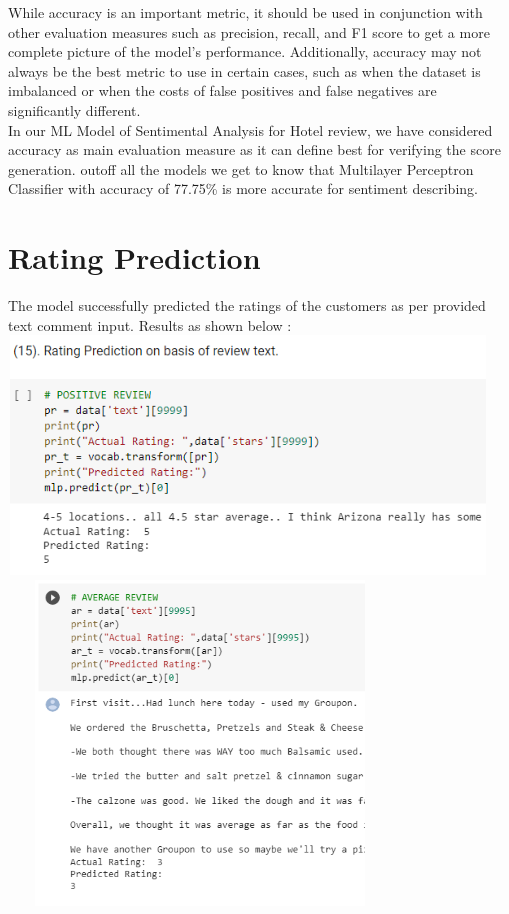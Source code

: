 \documentclass[a4paper, 12pt]{report}
\begin{document}
While accuracy is an important metric, it should be used in conjunction with other evaluation measures such as precision, recall, and F1 score to get a more complete picture of the model's performance. Additionally, accuracy may not always be the best metric to use in certain cases, such as when the dataset is imbalanced or when the costs of false positives and false negatives are significantly different.\\
In our ML Model of Sentimental Analysis for Hotel review, we have considered accuracy as main evaluation measure as it can define best for verifying the score generation. outoff all the models we get to know that Multilayer Perceptron Classifier with accuracy of 77.75\% is more accurate for sentiment describing.
\pagebreak
\section{Rating Prediction}
The model successfully predicted the ratings of the customers as per provided text comment input. Results as shown below :\\
\includegraphics[height=2.5in,width=5in]{27}\\
\includegraphics[height=3.4in,width=4in]{28}\\
\end{document}
